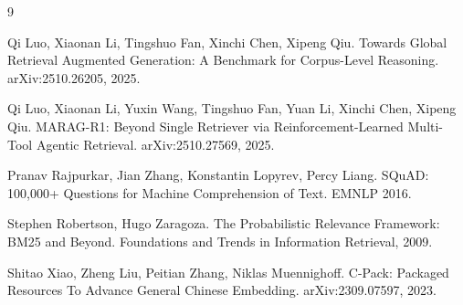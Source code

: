 \documentclass[11pt]{article}
\begin{document}
\begin{thebibliography}{9}

Qi Luo, Xiaonan Li, Tingshuo Fan, Xinchi Chen, Xipeng Qiu.
\newblock Towards Global Retrieval Augmented Generation: A Benchmark for Corpus-Level Reasoning.
\newblock arXiv:2510.26205, 2025.

Qi Luo, Xiaonan Li, Yuxin Wang, Tingshuo Fan, Yuan Li, Xinchi Chen, Xipeng Qiu.
\newblock MARAG-R1: Beyond Single Retriever via Reinforcement-Learned Multi-Tool Agentic Retrieval.
\newblock arXiv:2510.27569, 2025.

Pranav Rajpurkar, Jian Zhang, Konstantin Lopyrev, Percy Liang.
\newblock SQuAD: 100,000+ Questions for Machine Comprehension of Text.
\newblock EMNLP 2016.

Stephen Robertson, Hugo Zaragoza.
\newblock The Probabilistic Relevance Framework: BM25 and Beyond.
\newblock Foundations and Trends in Information Retrieval, 2009.

Shitao Xiao, Zheng Liu, Peitian Zhang, Niklas Muennighoff.
\newblock C-Pack: Packaged Resources To Advance General Chinese Embedding.
\newblock arXiv:2309.07597, 2023.

\end{thebibliography}
\end{document}
